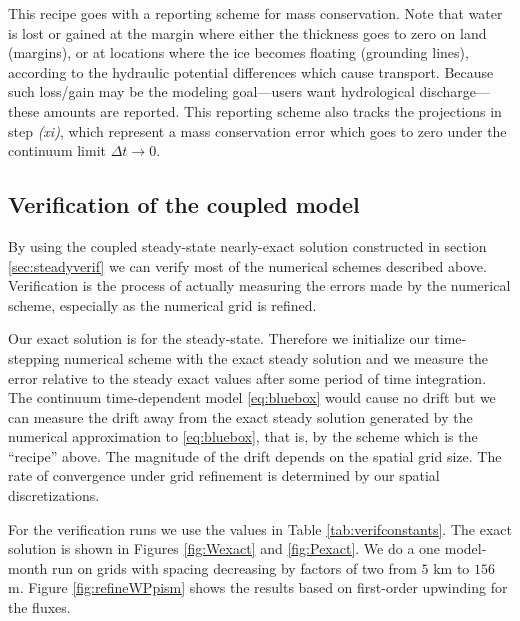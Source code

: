 \documentclass[11pt,final]{amsart}
\begin{document}
\medskip
This recipe goes with a reporting scheme for mass conservation.  Note that water is lost or gained at the margin where either the thickness goes to zero on land (margins), or at locations where the ice becomes floating (grounding lines), according to the hydraulic potential differences which cause transport.  Because such loss/gain may be the modeling goal---users want hydrological discharge---these amounts are reported.  This reporting scheme also tracks the projections in step \emph{(xi)}, which represent a mass conservation error which goes to zero under the continuum limit $\Delta t\to 0$.

\subsection*{Verification of the coupled model}  By using the coupled steady-state nearly-exact solution constructed in section \ref{sec:steadyverif} we can verify most of the numerical schemes described above.  Verification is the process of actually measuring the errors made by the numerical scheme, especially as the numerical grid is refined.

Our exact solution is for the steady-state.  Therefore we initialize our time-stepping numerical scheme with the exact steady solution and we measure the error relative to the steady exact values after some period of time integration.  The continuum time-dependent model \eqref{eq:bluebox} would cause no drift but we can measure the drift away from the exact steady solution generated by the numerical approximation to \eqref{eq:bluebox}, that is, by the scheme which is the ``recipe'' above.  The magnitude of the drift depends on the spatial grid size.  The rate of convergence under grid refinement is determined by our spatial discretizations.

For the verification runs we use the values in Table \ref{tab:verifconstants}.  The exact solution is shown in Figures \ref{fig:Wexact} and \ref{fig:Pexact}.  We do a one model-month run on grids with spacing decreasing by factors of two from $5$ km to $156$ m.  Figure \ref{fig:refineWPpism} shows the results based on first-order upwinding for the fluxes.
\end{document}
